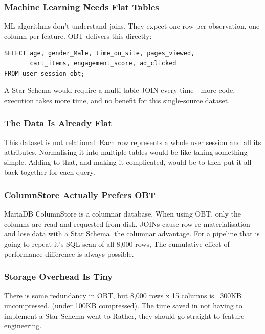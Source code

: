 \documentclass[12pt,a4paper]{article}
\begin{document}
\subsubsection*{Machine Learning Needs Flat Tables}

ML algorithms don't understand joins. They expect one row per observation, one column 
per feature. OBT delivers this directly:

\begin{verbatim}
SELECT age, gender_Male, time_on_site, pages_viewed,
       cart_items, engagement_score, ad_clicked
FROM user_session_obt;
\end{verbatim}

A Star Schema would require a multi-table JOIN every time - more code,  
execution takes more time, and no benefit for this single-source dataset.


\subsubsection*{The Data Is Already Flat}

This dataset is not relational. Each row represents a whole user session and all its 
attributes. Normalising it into multiple tables would be like taking something simple.
Adding to that, and making it complicated, would be to then put it all back together for each query.

\subsubsection*{ColumnStore Actually Prefers OBT}

MariaDB ColumnStore is a columnar database. When using OBT, only the columns are read and requested from disk. JOINs cause row re-materialisation and lose data with a Star Schema. 
the columnar advantage. For a pipeline that is going to repeat it's SQL scan of all 8,000 rows, 
The cumulative effect of performance difference is always possible.

\subsubsection*{Storage Overhead Is Tiny}

There is some redundancy in OBT, but 8,000 rows x 15 columns is ~300KB uncompressed. 
(under 100KB compressed). The time saved in not having to implement a Star Schema went to 
Rather, they should go straight to feature engineering.
\end{document}
